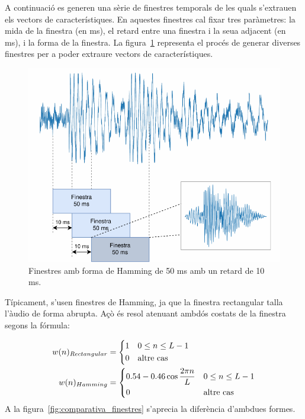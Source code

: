 A continuació es generen una sèrie de finestres temporals de les quals s'extrauen els vectors de característiques. En aquestes finestres cal fixar tres paràmetres: la mida de la finestra (en ms), el retard entre una finestra i la seua adjacent (en ms), i la forma de la finestra.
La figura~\ref{fig:finestres_temporals} representa el procés de generar diverses finestres per a poder extraure vectors de característiques.
\begin{figure}[ht!]
    \centering
    \includegraphics{figuras/finestres_temporals.pdf}
    \caption{Finestres amb forma de Hamming de 50 ms amb un retard de 10 ms.}
    \label{fig:finestres_temporals}
\end{figure}
Típicament, s'usen finestres de Hamming, ja que la finestra rectangular talla l'àudio de forma abrupta. Açò és resol atenuant ambdós costats de la finestra segons la fórmula:

        \begin{align}
            w(n)_{Rectangular} &=
                \begin{dcases}
                    1 & 0 \leq n \leq L-1 \\
                    0 & \text{altre cas}
                \end{dcases} \\
            w(n)_{Hamming} &=
                \begin{dcases}
                    0.54 - 0.46 \cos \frac{2 \pi n}{L} & 0 \leq n \leq L-1 \\
                    0 & \text{altre cas}
                \end{dcases}
        \end{align}
        A la figura~\ref{fig:comparativa_finestres} s'aprecia la diferència d'ambdues formes.

